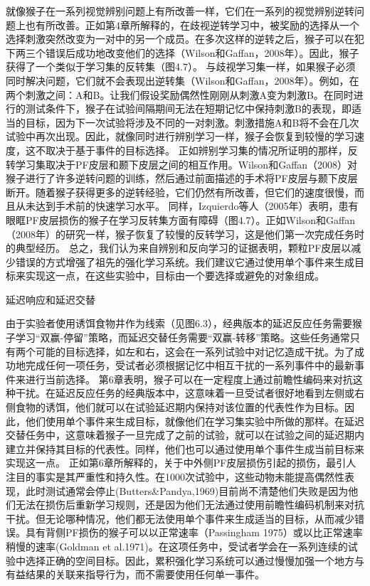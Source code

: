 就像猴子在一系列视觉辨别问题上有所改善一样，它们在一系列的视觉辨别逆转问题上也有所改善。正如第4章所解释的，在歧视逆转学习中，被奖励的选择从一个选择刺激突然改变为一对中的另一个成员。在多次这样的逆转之后，猴子可以在犯下两三个错误后成功地改变他们的选择（Wilson和Gaffan，2008年）。因此，猴子获得了一个类似于学习集的反转集（图4.7）。
与歧视学习集一样，如果猴子必须同时解决问题，它们就不会表现出逆转集（Wilson和Gaffan，2008年）。例如，在两个刺激之间：A和B。让我们假设奖励偶然性刚刚从刺激A变为刺激B。在同时进行的测试条件下，猴子在试验间隔期间无法在短期记忆中保持刺激B的表现，即适当的目标，因为下一次试验将涉及不同的一对刺激。刺激措施A和B将不会在几次试验中再次出现。因此，就像同时进行辨别学习一样，猴子会恢复到较慢的学习速度，这不取决于基于事件的目标选择。
正如辨别学习集的情况所证明的那样，反转学习集取决于PF皮层和颞下皮层之间的相互作用。Wilson和Gaffan（2008）对猴子进行了许多逆转问题的训练，然后通过前面描述的手术将PF皮层与颞下皮层断开。随着猴子获得更多的逆转经验，它们仍然有所改善，但它们的速度很慢，而且从未达到手术前的快速学习水平。
同样，Izquierdo等人（2005年）表明，患有眼眶PF皮层损伤的猴子在学习反转集方面有障碍（图4.7）。正如Wilson和Gaffan（2008年）的研究一样，猴子恢复了较慢的反转学习，这是他们第一次完成任务时的典型经历。
总之，我们认为来自辨别和反向学习的证据表明，颗粒PF皮层以减少错误的方式增强了祖先的强化学习系统。我们建议它通过使用单个事件来生成目标来实现这一点，在这些实验中，目标由一个要选择或避免的对象组成。

延迟响应和延迟交替

由于实验者使用诱饵食物井作为线索（见图6.3），经典版本的延迟反应任务需要猴子学习“双赢-停留”策略，而延迟交替任务需要“双赢-转移”策略。这些任务通常只有两个可能的目标选择，如左和右，这会在一系列试验中对记忆造成干扰。为了成功地完成任何一项任务，受试者必须根据记忆中相互干扰的一系列事件中的最新事件来进行当前选择。
第6章表明，猴子可以在一定程度上通过前瞻性编码来对抗这种干扰。在延迟反应任务的经典版本中，这意味着一旦受试者很好地看到左侧或右侧食物的诱饵，他们就可以在试验延迟期内保持对该位置的代表性作为目标。因此，他们使用单个事件来生成目标，就像他们在学习集实验中所做的那样。在延迟交替任务中，这意味着猴子一旦完成了之前的试验，就可以在试验之间的延迟期内建立并保持其目标的代表性。同样，他们也可以通过使用单个事件生成当前目标来实现这一点。
正如第6章所解释的，关于中外侧PF皮层损伤引起的损伤，最引人注目的事实是其严重性和持久性。在1000次试验中，这些动物未能提高偶然性表现，此时测试通常会停止(Butters\&Pandya,1969)目前尚不清楚他们失败是因为他们无法在损伤后重新学习规则，还是因为他们无法通过使用前瞻性编码机制来对抗干扰。但无论哪种情况，他们都无法使用单个事件来生成适当的目标，从而减少错误。具有背侧PF损伤的猴子可以以正常速率（Passingham 1975）或以比正常速率稍慢的速率(Goldman et al.1971)。在这项任务中，受试者学会在一系列连续的试验中选择正确的空间目标。因此，累积强化学习系统可以通过慢慢加强一个地方与有益结果的关联来指导行为，而不需要使用任何单一事件。

